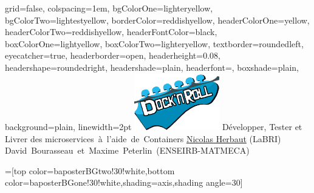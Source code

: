 \documentclass[portrait,final,a0paper]{baposter}
\begin{document}
\newlength{\leftimgwidth}
\begin{poster}%
  {
  grid=false,
  colspacing=1em,
  bgColorOne=lighteryellow,
  bgColorTwo=lightestyellow,
  borderColor=reddishyellow,
  headerColorOne=yellow,
  headerColorTwo=reddishyellow,
  headerFontColor=black,
  boxColorOne=lightyellow,
  boxColorTwo=lighteryellow,
  textborder=roundedleft,
  eyecatcher=true,
  headerborder=open,
  headerheight=0.08\textheight,
  headershape=roundedright,
  headershade=plain,
  headerfont=\Large\textsf, %
  boxshade=plain,
  background=plain,
  linewidth=2pt
  }
  {\includegraphics[width=10em]{docknroll}} %
  {\sf %
   Développer, Tester et Livrer des \mbox{microservices à l'aide de Containers}}
  {\sf %
  \underline{Nicolas Herbaut} (LaBRI) \mbox{David Bourasseau et Maxime Peterlin (ENSEIRB-MATMECA)}
  }
  {%
  }

  =[top color=baposterBGtwo!30!white,bottom color=baposterBGone!30!white,shading=axis,shading angle=30]

     \setlength{\leftimgwidth}{0.78em+8.0em}


\end{poster}
\end{document}

